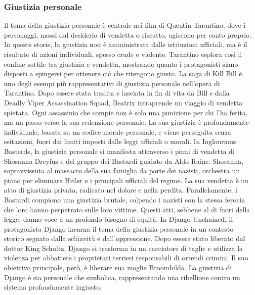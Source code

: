 \documentclass[12pt]{article} %
\begin{document}
\begin{flushleft}
    \subsubsection*{Giustizia personale}
    Il tema della giustizia personale è centrale nei film di Quentin Tarantino, dove i personaggi, mossi dal desiderio di vendetta o riscatto, agiscono per conto proprio. In queste storie, la giustizia non è amministrata dalle istituzioni ufficiali, ma è il risultato di azioni individuali, spesso crude e violente. Tarantino esplora così il confine sottile tra giustizia e vendetta, mostrando quanto i protagonisti siano disposti a spingersi per ottenere ciò che ritengono giusto.
    La saga di Kill Bill è uno degli esempi più rappresentativi di giustizia personale nell'opera di Tarantino. Dopo essere stata tradita e lasciata in fin di vita da Bill e dalla Deadly Viper Assassination Squad, Beatrix intraprende un viaggio di vendetta spietata. Ogni assassinio che compie non è solo una punizione per chi l’ha ferita, ma un passo verso la sua redenzione personale. La sua giustizia è profondamente individuale, basata su un codice morale personale, e viene perseguita senza esitazioni, fuori dai limiti imposti dalle leggi ufficiali o morali.
    In Inglourious Basterds, la giustizia personale si manifesta attraverso i piani di vendetta di Shosanna Dreyfus e del gruppo dei Bastardi guidato da Aldo Raine. Shosanna, sopravvissuta al massacro della sua famiglia da parte dei nazisti, orchestra un piano per eliminare Hitler e i principali ufficiali del regime. La sua vendetta è un atto di giustizia privata, radicato nel dolore e nella perdita. Parallelamente, i Bastardi compiono una giustizia brutale, colpendo i nazisti con la stessa ferocia che loro hanno perpetrato sulle loro vittime. Questi atti, sebbene al di fuori della legge, danno voce a un profondo bisogno di equità.
    In Django Unchained, il protagonista Django incarna il tema della giustizia personale in un contesto storico segnato dalla schiavitù e dall'oppressione. Dopo essere stato liberato dal dottor King Schultz, Django si trasforma in un cacciatore di taglie e utilizza la violenza per abbattere i proprietari terrieri responsabili di orrendi crimini. Il suo obiettivo principale, però, è liberare sua moglie Broomhilda. La giustizia di Django è sia personale che simbolica, rappresentando una ribellione contro un sistema profondamente ingiusto.

\end{flushleft}
\end{document}
